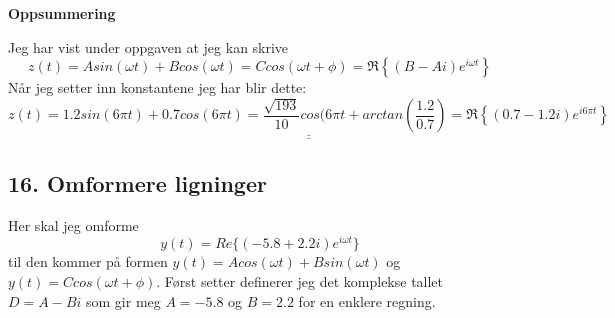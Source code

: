 \documentclass[a4paper,12pt,norsk]{article}
\newcommand{\uu}{\underline}
\begin{document}
\begin{center}
\textbf{Oppsummering}
\end{center}
Jeg har vist under oppgaven at jeg kan skrive 
$$
 z(t) = Asin(\omega t) + Bcos(\omega t) = Ccos(\omega t + \phi) = \Re \left\{(B-Ai)e^{i\omega t} \right\}
$$
Når jeg setter inn konstantene jeg har blir dette:
$$
\uu{\uu {z(t) = 1.2sin(6\pi t) + 0.7cos(6\pi t) = \frac{\sqrt{193}}{10}cos(6\pi t + arctan\left(\frac{1.2}{0.7}\right) = \Re \left\{(0.7 - 1.2i)e^{i6\pi t} \right\} }}
$$
\subsection{16. Omformere ligninger}
Her skal jeg omforme 
$$
y(t) = Re\big\{ (-5.8 + 2.2i)e^{i\omega t}\big\}
$$
til den kommer på formen $y(t) = Acos(\omega t) + Bsin(\omega t)$ og $y(t) = Ccos(\omega t + \phi)$. Først setter definerer jeg det komplekse tallet $D = A - Bi$ som gir meg $A=-5.8$ og $B=2.2$ for en enklere regning. 
\end{document}
